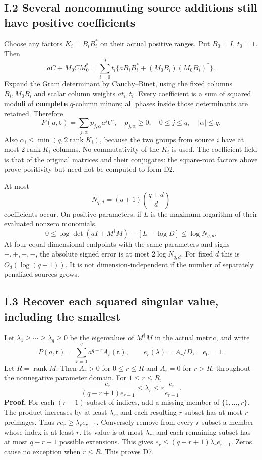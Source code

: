 \subsection{I.2 Several noncommuting source additions still have positive coefficients}\label{i.2-several-noncommuting-source-additions-still-have-positive-coefficients}

Choose any factors \(K_i=B_iB_i^*\) on their actual positive ranges. Put \(B_0=I\), \(t_0=1\). Then \[
 aC+M_0CM_0^*=
 \sum_{i=0}^d t_i\{aB_iB_i^*+(M_0B_i)(M_0B_i)^*\}.
 \tag{D4}
\] Expand the Gram determinant by Cauchy--Binet, using the fixed columns \(B_i,M_0B_i\) and scalar column weights \(at_i,t_i\). Every coefficient is a sum of squared moduli of \textbf{complete} \(q\)-column minors; all phases inside those determinants are retained. Therefore \[
 P(a,\boldsymbol t)=\sum_{j,\alpha}p_{j,\alpha}a^j\boldsymbol t^\alpha,
 \quad p_{j,\alpha}\ge0,\quad 0\le j\le q,\quad |\alpha|\le q.
 \tag{D5}
\] Also \(\alpha_i\le\min(q,2\operatorname{rank}K_i)\), because the two groups from source \(i\) have at most \(2\operatorname{rank}K_i\) columns. No commutativity of the \(K_i\) is used. The coefficient field is that of the original matrices and their conjugates: the square-root factors above prove positivity but need not be computed to form D2.

At most \[
 N_{q,d}=(q+1)\binom{q+d}{d}
\] coefficients occur. On positive parameters, if \(L\) is the maximum logarithm of their evaluated nonzero monomials, \[
 0\le\log\det(aI+M^\dagger M)-[L-\log D]\le\log N_{q,d}.
 \tag{D6}
\] At four equal-dimensional endpoints with the same parameters and signs \(+,+,-,-\), the absolute signed error is at most \(2\log N_{q,d}\). For fixed \(d\) this is \(O_d(\log(q+1))\). It is not dimension-independent if the number of separately penalized sources grows.

\subsection{I.3 Recover each squared singular value, including the smallest}\label{i.3-recover-each-squared-singular-value-including-the-smallest}

Let \(\lambda_1\ge\cdots\ge\lambda_q\ge0\) be the eigenvalues of \(M^\dagger M\) in the actual metric, and write \[
 P(a,\boldsymbol t)=\sum_{r=0}^q a^{q-r}A_r(\boldsymbol t),\qquad
 e_r(\lambda)=A_r/D,\quad e_0=1.
\] Let \(R=\operatorname{rank}M\). Then \(A_r>0\) for \(0\le r\le R\) and \(A_r=0\) for \(r>R\), throughout the nonnegative parameter domain. For \(1\le r\le R\), \[
 \boxed{\frac{e_r}{(q-r+1)e_{r-1}}
 \le\lambda_r\le r\frac{e_r}{e_{r-1}}.}
 \tag{D7}
\] \textbf{Proof.} For each \((r-1)\)-subset of indices, add a missing member of \(\{1,\ldots,r\}\). The product increases by at least \(\lambda_r\), and each resulting \(r\)-subset has at most \(r\) preimages. Thus \(re_r\ge\lambda_re_{r-1}\). Conversely remove from every \(r\)-subset a member whose index is at least \(r\). Its value is at most \(\lambda_r\), and each remaining subset has at most \(q-r+1\) possible extensions. This gives \(e_r\le(q-r+1)\lambda_re_{r-1}\). Zeros cause no exception when \(r\le R\). This proves D7.


